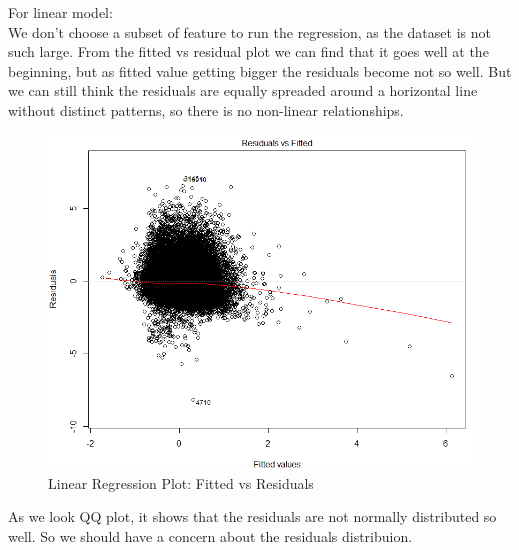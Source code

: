 \documentclass[12pt]{article}
\begin{document}
For linear model: \\
    We don't choose a subset of feature to run the regression, as the dataset is not such large. From the fitted vs residual plot we can find that it goes well at the beginning, but as fitted value getting bigger the residuals become not so well. But we can still think the residuals are equally spreaded around a horizontal line without distinct patterns, so there is no non-linear relationships.   \\
    
    \begin{figure}[h]
        \centering
        \includegraphics[width=\linewidth]{linear_fvsr.png}
        \caption{Linear Regression Plot: Fitted vs Residuals}
    \end{figure}  
    
    As we look QQ plot, it shows that the residuals are not normally distributed so well. So we should have a concern about the residuals distribuion.\\
    
\end{document}
